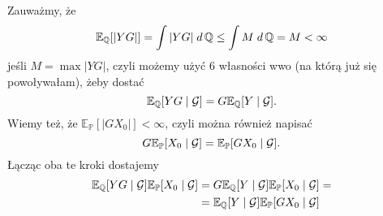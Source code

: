 \documentclass{article}
\newcommand{\E}{\mathbb{E}}
\renewcommand{\P}{\mathbb{P}}
\begin{document}
Zauważmy, że
$$\E_{\Q}[|YG|]=\int|YG|\;d\Q\leq \int M\;d\Q=M<\infty$$
jeśli $M=\max|YG|$, czyli możemy użyć 6 własności wwo (na którą już się powoływałam), żeby dostać
$$\E_{\Q}[YG\;|\;\set{G}]=G\E_{\Q}[Y\;|\;\set{G}].$$
Wiemy też, że $\E_{\P}[|GX_0|]<\infty$, czyli można również napisać
$$G\E_{\P}[X_0\;|\;\set{G}]=\E_{\P}[GX_0\;|\;\set{G}].$$
Łącząc oba te kroki dostajemy
\begin{align*}
  \E_{\Q}[YG\;|\;\set{G}]\E_{\P}[X_0\;|\;\set{G}]&=G\E_{\Q}[Y\;|\;\set{G}]\E_{\P}[X_0\;|\;\set{G}]=\\
      &=\E_{\Q}[Y\;|\;\set{G}]\E_{\P}[GX_0\;|\;\set{G}]
\end{align*}
\end{document}

